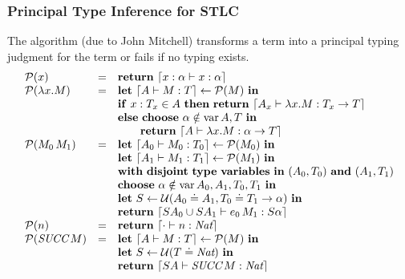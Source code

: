 \documentclass[pdftex,aspectratio=169]{beamer}
\begin{document}
\begin{frame}
  \frametitle{Principal Type Inference for STLC}
  \small
  The algorithm (due to John Mitchell) transforms a term into a principal typing judgment for
  the term or fails if no typing exists.
  \begin{displaymath}
    \begin{array}{lcl}
      \calP (x) &=& \mathbf{return}\ \Encode{x:\alpha \vdash x : \alpha} \\
      \calP (\Lam{x} M) &=&
      \mathbf{let}\ \Encode{\Tenv \vdash M : T} \gets \calP (M) \ \mathbf{in}\\
      && \mathbf{if}\ x:T_x \in\Tenv\ \mathbf{then\ return}\ \Encode{\Tenv_x
      \vdash \Lam{x}M : T_x \to T} \\
      && \mathbf{else}\ \mathbf{choose}\ \alpha\notin\var{\Tenv,T}\
      \mathbf{in} \\
      &&\qquad \mathbf{return}\ \Encode{\Tenv \vdash \Lam{x}M : \alpha\to T} \\
      \calP (\App{M_0}{M_1}) &=&
      \mathbf{let}\ \Encode{\Tenv_0\vdash M_0 : T_0} \gets \calP (M_0)\ \mathbf{in} \\
      && \mathbf{let}\ \Encode{\Tenv_1\vdash M_1 : T_1} \gets \calP (M_1)\
      \mathbf{in} \\
      && \mathbf{with\ disjoint\ type\ variables\ in\ } (\Tenv_0,
      T_0)\ \mathbf{and}\ (\Tenv_1, T_1) \\
      && \mathbf{choose}\ \alpha\notin \var{\Tenv_0,\Tenv_1,
        T_0,T_1}\ \mathbf{in} \\
      && \mathbf{let}\ S \gets \calU (\Tenv_0 \doteq \Tenv_1, T_0
      \doteq T_1 \to \alpha)\
      \mathbf{in} \\
      && \mathbf{return}\ \Encode{S\Tenv_0 \cup S\Tenv_1 \vdash
      \App{e_0}{M_1} : S\alpha} \\
      \calP (n) &=& \mathbf{return}\ \Encode{\cdot \vdash 
      n : \Nat} \\
      \calP (\Succ M) &=& \mathbf{let}\ \Encode{\Tenv \vdash M : T} \gets
      \calP (M)\ \mathbf{in} \\
      && \mathbf{let}\ S \gets \calU (T\doteq\Nat)\ \mathbf{in} \\\
      && \mathbf{return}\ \Encode{S\Tenv \vdash \Succ M: \Nat} 
    \end{array}
  \end{displaymath}
\end{frame}
\end{document}
